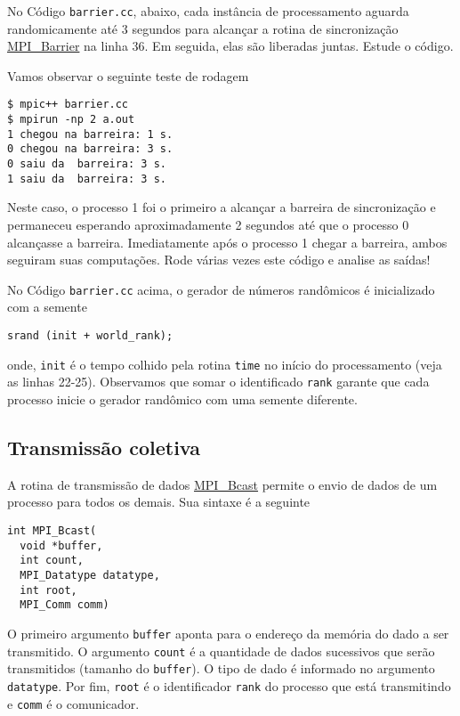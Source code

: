 \begin{ex}
  No Código \verb+barrier.cc+, abaixo, cada instância de processamento aguarda randomicamente até 3 segundos para alcançar a rotina de sincronização \href{https://www.open-mpi.org/doc/current/man3/MPI\_Barrier.3.php}{MPI\_Barrier} na linha 36. Em seguida, elas são liberadas juntas. Estude o código.



Vamos observar o seguinte teste de rodagem
\begin{verbatim}
$ mpic++ barrier.cc
$ mpirun -np 2 a.out                                                          
1 chegou na barreira: 1 s.
0 chegou na barreira: 3 s.
0 saiu da  barreira: 3 s.
1 saiu da  barreira: 3 s.
\end{verbatim}
Neste caso, o processo 1 foi o primeiro a alcançar a barreira de sincronização e permaneceu esperando aproximadamente 2 segundos até que o processo 0 alcançasse a barreira. Imediatamente após o processo 1 chegar a barreira, ambos seguiram suas computações. Rode várias vezes este código e analise as saídas!
\end{ex}

\begin{obs}
  No Código \verb+barrier.cc+ acima, o gerador de números randômicos é inicializado com a semente
\begin{verbatim}
srand (init + world_rank);
\end{verbatim}
  onde, \verb+init+ é o tempo colhido pela rotina \verb+time+ no início do processamento (veja as linhas 22-25). Observamos que somar o identificado \verb+rank+ garante que cada processo inicie o gerador randômico com uma semente diferente.
\end{obs}

\subsection {Transmissão coletiva}

A rotina de transmissão de dados \href{https://www.open-mpi.org/doc/current/man3/MPI\_Bcast.3.php}{MPI\_Bcast} permite o envio de dados de um processo para todos os demais. Sua sintaxe é a seguinte
\begin{verbatim}
int MPI_Bcast(
  void *buffer, 
  int count, 
  MPI_Datatype datatype,
  int root, 
  MPI_Comm comm)
\end{verbatim}
O primeiro argumento \verb+buffer+ aponta para o endereço da memória do dado a ser transmitido. O argumento \verb+count+ é a quantidade de dados sucessivos que serão transmitidos (tamanho do \verb+buffer+). O tipo de dado é informado no argumento \verb+datatype+. Por fim, \verb+root+ é o identificador \verb+rank+ do processo que está transmitindo e \verb+comm+ é o comunicador.

